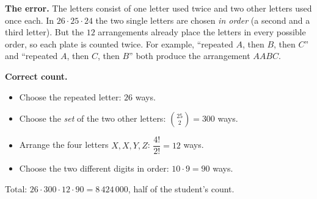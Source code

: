 \textbf{The error.} The letters consist of one letter used twice and two other letters used once each. In $26\cdot25\cdot24$ the two single letters are chosen \emph{in order} (a second and a third letter). But the $12$ arrangements already place the letters in every possible order, so each plate is counted twice. For example, ``repeated $A$, then $B$, then $C$'' and ``repeated $A$, then $C$, then $B$'' both produce the arrangement $AABC$.

\textbf{Correct count.}
\begin{itemize}
\item Choose the repeated letter: $26$ ways.
\item Choose the \emph{set} of the two other letters: $\binom{25}{2}=300$ ways.
\item Arrange the four letters $X,X,Y,Z$: $\dfrac{4!}{2!}=12$ ways.
\item Choose the two different digits in order: $10\cdot9=90$ ways.
\end{itemize}
Total: $26\cdot300\cdot12\cdot90=\boxed{8\,424\,000}$, half of the student's count.
